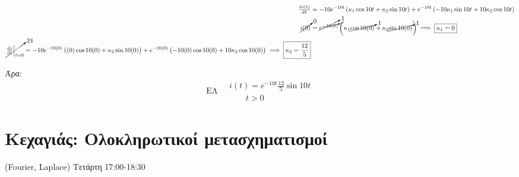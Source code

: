 \documentclass[11pt,a4paper,titlepage,draft]{article}
\begin{document}
\begin{exercise*}{5.5}
\begin{align*}
\od{i(t)}{t}&=-10e^{-10t}\left(
\kappa_1\cos10t+\kappa_2\sin10t
\right)+
e^{-10t}\left(
-10\kappa_1\sin10t+10\kappa_2\cos10t
\right)\\
\cancelto{0}{i(0)}&=\cancelto{1}{e^{\cancelto{0}{-10(0)}}}\left(
\kappa_1 \cancelto{1}{\cos10(0)} + \kappa_2 \cancelto{1}{\sin10(0)}
\right) \implies \boxed{
\kappa_1=0
}\\
\cancelto{24}{\left.\od{i}{t}\right|_{t=0}} =
-10e^{-10(0)}\left(
(0)\cos10(0)+\kappa_2\sin10(0)
\right)+e^{-10(0)}\left(-10(0)\cos10(0)+10\kappa_2\cos10(0)\right)
\implies \boxed{\kappa_2=\frac{12}{5}}
\end{align*}

Άρα:
\[
\boxed{
\text{ΕΛ} \quad
\begin{array}{l}
i(t) = e^{-10t} \frac{12}{5}\sin10t\\
\qquad t>0
\end{array}
}
\]

\end{exercise*}































































\newpage

\part{Κεχαγιάς: Ολοκληρωτικοί μετασχηματισμοί}
\textlatin{(Fourier, Laplace)}
Τετάρτη 17:00-18:30
\end{document}
